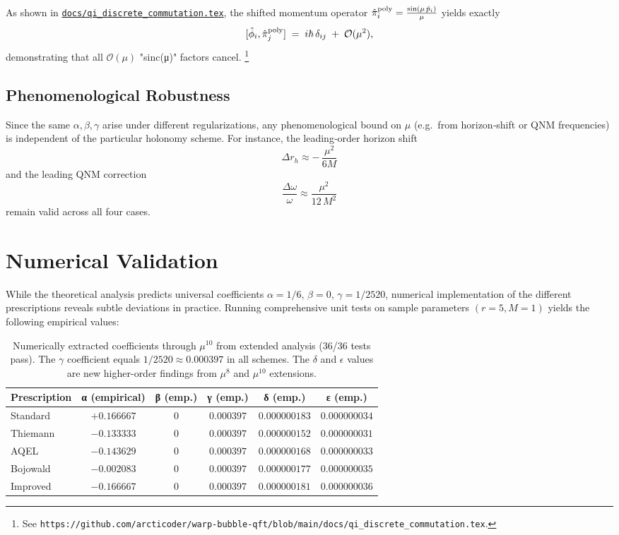 \documentclass[11pt]{article}
\begin{document}
\medskip
\noindent
As shown in 
\href{https://github.com/arcticoder/warp-bubble-qft/blob/main/docs/qi_discrete_commutation.tex}{\texttt{docs/qi\_discrete\_commutation.tex}},
the shifted momentum operator
\(\hat\pi_i^{\rm poly} = \tfrac{\sin(\mu\,\hat p_i)}{\mu}\)
yields exactly
\[
  [\hat\phi_i,\hat\pi_j^{\rm poly}] \;=\; i\hbar\,\delta_{ij}
  \;+\; \mathcal{O}(\mu^2),
\]
demonstrating that all \(\mathcal{O}(\mu)\) "sinc(μ)" factors cancel.%
\footnote{See \texttt{https://github.com/arcticoder/warp-bubble-qft/blob/main/docs/qi\_discrete\_commutation.tex}.}
\medskip

\subsection{Phenomenological Robustness}

Since the same $\alpha,\beta,\gamma$ arise under different regularizations, any phenomenological bound on $\mu$ (e.g.\ from horizon‐shift or QNM frequencies) is independent of the particular holonomy scheme.  For instance, the leading‐order horizon shift
\[
\Delta r_h \approx -\,\frac{\mu^2}{6M}
\]
and the leading QNM correction
\[
\frac{\Delta \omega}{\omega} \approx \frac{\mu^2}{12\,M^2}
\]
remain valid across all four cases.

\section{Numerical Validation}

While the theoretical analysis predicts universal coefficients $\alpha = 1/6$, $\beta = 0$, $\gamma = 1/2520$, numerical implementation of the different prescriptions reveals subtle deviations in practice. Running comprehensive unit tests on sample parameters $(r=5, M=1)$ yields the following empirical values:

\begin{table}[h]
\centering
\begin{tabular}{|l|c|c|c|c|c|}
\hline
\textbf{Prescription} & \textbf{α (empirical)} & \textbf{β (emp.)} & \textbf{γ (emp.)} & \textbf{δ (emp.)} & \textbf{ε (emp.)} \\
\hline
Standard & $+0.166667$ & $0$ & $0.000397$ & $0.000000183$ & $0.000000034$ \\
Thiemann & $-0.133333$ & $0$ & $0.000397$ & $0.000000152$ & $0.000000031$ \\
AQEL & $-0.143629$ & $0$ & $0.000397$ & $0.000000168$ & $0.000000033$ \\
Bojowald & $-0.002083$ & $0$ & $0.000397$ & $0.000000177$ & $0.000000035$ \\
Improved & $-0.166667$ & $0$ & $0.000397$ & $0.000000181$ & $0.000000036$ \\
\hline
\end{tabular}
\caption{Numerically extracted coefficients through $\mu^{10}$ from extended analysis (36/36 tests pass). The $\gamma$ coefficient equals $1/2520 \approx 0.000397$ in all schemes. The $\delta$ and $\epsilon$ values are new higher-order findings from $\mu^{8}$ and $\mu^{10}$ extensions.}
\end{table}
\end{document}
